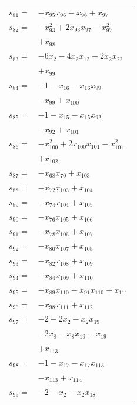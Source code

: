 \begin{longtable}{@{}r@{\;}l@{}}
\(s_{81}=\) & \(\displaystyle -x_{95}x_{96} -x_{96} +x_{97}\) \\[3pt]
\(s_{82}=\) & \(\displaystyle -x_{93}^{2} +2x_{93}x_{97} -x_{97}^{2}\) \\
 & \(\displaystyle +x_{98}\) \\[3pt]
\(s_{83}=\) & \(\displaystyle -6x_{2} -4x_{2}x_{12} -2x_{2}x_{22}\) \\
 & \(\displaystyle +x_{99}\) \\[3pt]
\(s_{84}=\) & \(\displaystyle -1 -x_{16} -x_{16}x_{99}\) \\
 & \(\displaystyle -x_{99} +x_{100}\) \\[3pt]
\(s_{85}=\) & \(\displaystyle -1 -x_{15} -x_{15}x_{92}\) \\
 & \(\displaystyle -x_{92} +x_{101}\) \\[3pt]
\(s_{86}=\) & \(\displaystyle -x_{100}^{2} +2x_{100}x_{101} -x_{101}^{2}\) \\
 & \(\displaystyle +x_{102}\) \\[3pt]
\(s_{87}=\) & \(\displaystyle -x_{68}x_{70} +x_{103}\) \\[3pt]
\(s_{88}=\) & \(\displaystyle -x_{72}x_{103} +x_{104}\) \\[3pt]
\(s_{89}=\) & \(\displaystyle -x_{74}x_{104} +x_{105}\) \\[3pt]
\(s_{90}=\) & \(\displaystyle -x_{76}x_{105} +x_{106}\) \\[3pt]
\(s_{91}=\) & \(\displaystyle -x_{78}x_{106} +x_{107}\) \\[3pt]
\(s_{92}=\) & \(\displaystyle -x_{80}x_{107} +x_{108}\) \\[3pt]
\(s_{93}=\) & \(\displaystyle -x_{82}x_{108} +x_{109}\) \\[3pt]
\(s_{94}=\) & \(\displaystyle -x_{84}x_{109} +x_{110}\) \\[3pt]
\(s_{95}=\) & \(\displaystyle -x_{89}x_{110} -x_{91}x_{110} +x_{111}\) \\[3pt]
\(s_{96}=\) & \(\displaystyle -x_{98}x_{111} +x_{112}\) \\[3pt]
\(s_{97}=\) & \(\displaystyle -2 -2x_{2} -x_{2}x_{19}\) \\
 & \(\displaystyle -2x_{8} -x_{8}x_{19} -x_{19}\) \\
 & \(\displaystyle +x_{113}\) \\[3pt]
\(s_{98}=\) & \(\displaystyle -1 -x_{17} -x_{17}x_{113}\) \\
 & \(\displaystyle -x_{113} +x_{114}\) \\[3pt]
\(s_{99}=\) & \(\displaystyle -2 -x_{2} -x_{2}x_{18}\) \\

\end{longtable}
